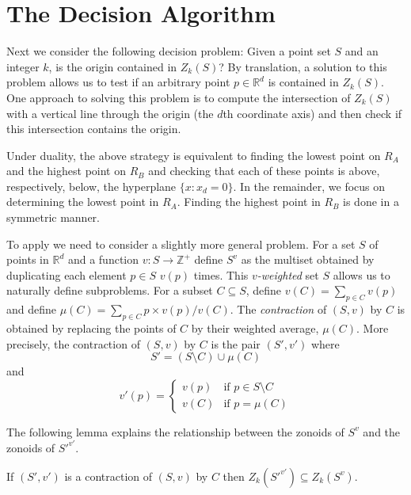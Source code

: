 \documentclass[lotsofwhite]{patmorin}
\begin{document}
\section{The Decision Algorithm}

Next we consider the following decision problem:  Given a point set
$S$ and an integer $k$, is the origin contained in $Z_k(S)$?  By
translation, a solution to this problem allows us to test if an
arbitrary point $p\in\mathbb{R}^d$ is contained in $Z_k(S)$. One
approach to solving this problem is to compute the intersection of
$Z_k(S)$ with a vertical line through the origin (the $d$th coordinate
axis) and then check if this intersection contains the origin. 

Under duality, the above strategy is equivalent to finding the lowest
point on $R_A$ and the highest point on $R_B$ and checking that each
of these points is above, respectively, below, the hyperplane
$\{x:x_d=0\}$.
In the remainder, we focus on determining the lowest point in $R_A$.
Finding the highest point in $R_B$ is done in a symmetric manner.  

To apply  we need to consider a slightly more general
problem.  For a set $S$ of points in $\mathbb{R}^d$ and a function
$v:S\rightarrow\mathbb{Z}^+$ define $S^v$ as the multiset obtained by
duplicating each element $p\in S$ $v(p)$ times.  This
\emph{$v$-weighted} set $S$ allows us to naturally define subproblems.
For a subset $C\subseteq S$, define $v(C)=\sum_{p\in C}v(p)$ and
define $\mu(C)=\sum_{p\in C} p\times v(p)/v(C)$.  The
\emph{contraction} of $(S,v)$ by $C$ is obtained by replacing the
points of $C$ by their weighted average, $\mu(C)$.  More precisely,
the contraction of $(S,v)$ by $C$ is the pair $(S',v')$ where
\[
    S' = (S\setminus C)
	\cup \mu(C)
\]
and 
\[
    v'(p) = \left\{\begin{array}{ll}
                   v(p) & \mbox{if $p\in S\setminus C$} \\
                   v(C) & \mbox{if $p=\mu(C)$}
    \end{array}\right.
\]

The following lemma explains the relationship between the zonoids of
$S^v$ and the zonoids of $S'^{v'}$.

\begin{lem}
If $(S',v')$ is a contraction of $(S,v)$ by $C$ then $Z_k(S'^{v'})
\subseteq Z_k(S^v)$.
\end{lem}
\end{document}
